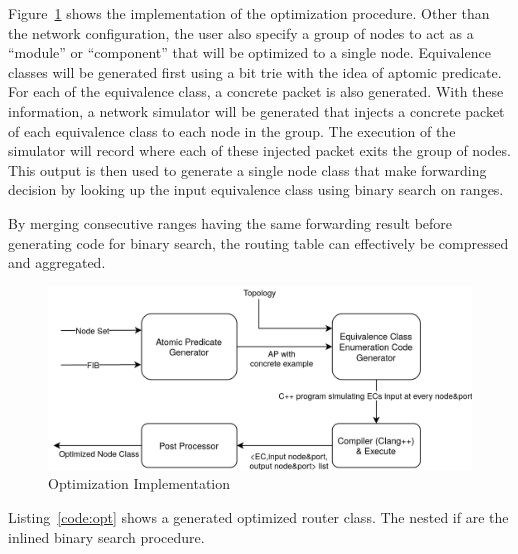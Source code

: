 \documentclass[letterpaper, 10 pt, conference]{ieeeconf}  %
\begin{document}
Figure~\ref{fig:opt} shows the implementation of the optimization procedure. Other than the network configuration, the user also specify a group of nodes to act as a ``module'' or ``component'' that will be optimized to a single node. Equivalence classes will be generated first using a bit trie with the idea of aptomic predicate. For each of the equivalence class, a concrete packet is also generated. With these information, a network simulator will be generated that injects a concrete packet of each equivalence class to each node in the group. The execution of the simulator will record where each of these injected packet exits the group of nodes. This output is then used to generate a single node class that make forwarding decision by looking up the input equivalence class using binary search on ranges.

By merging consecutive ranges having the same forwarding result before generating code for binary search, the routing table can effectively be compressed and aggregated.

\begin{figure}[]
 \centering
 \includegraphics[width=\linewidth]{optimization.png}
 \caption{Optimization Implementation}
 \label{fig:opt}
\end{figure}

Listing~\ref{code:opt} shows a generated optimized router class. The nested if are the inlined binary search procedure.
\end{document}
